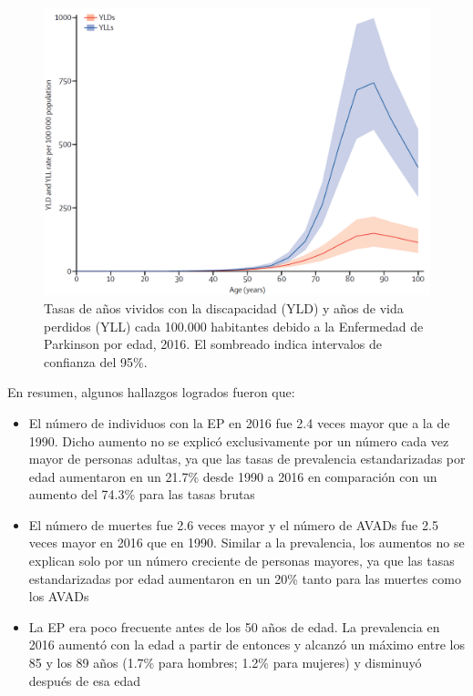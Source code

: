 \begin{figure}[H]
\includegraphics[width=\textwidth]{TESIS/imagenes/chap02/yll_yld.PNG}
\caption{ Tasas de años vividos con la discapacidad (YLD) y años de vida perdidos (YLL) cada 100.000 habitantes debido a la Enfermedad de Parkinson por edad, 2016. El sombreado indica intervalos de confianza del 95\%. \cite{Dorsey2018} }
\label{fig:yll_yld}
\end{figure}

\noindent En resumen, algunos hallazgos logrados fueron que:

\begin{itemize}
    \item El número de individuos con la EP en 2016 fue 2.4 veces mayor que a la de  1990. Dicho aumento no se explicó exclusivamente por un número cada vez mayor de personas adultas, ya que las tasas de prevalencia estandarizadas por edad aumentaron en un 21.7\% desde 1990 a 2016 en comparación con un aumento del 74.3\%  para las tasas brutas
    \item El número de muertes fue 2.6 veces mayor y el número de AVADs fue 2.5 veces mayor en 2016 que en 1990. Similar a la prevalencia, los aumentos no se explican solo por un número creciente de personas mayores, ya que las tasas estandarizadas por edad aumentaron en un 20\% tanto para las muertes como los AVADs
    \item La EP era poco frecuente antes de los 50 años de edad. La prevalencia en 2016 aumentó con la edad a partir de entonces y alcanzó un máximo entre los 85 y los 89 años (1.7\% para hombres; 1.2\% para mujeres) y disminuyó después de esa edad
\end{itemize}

